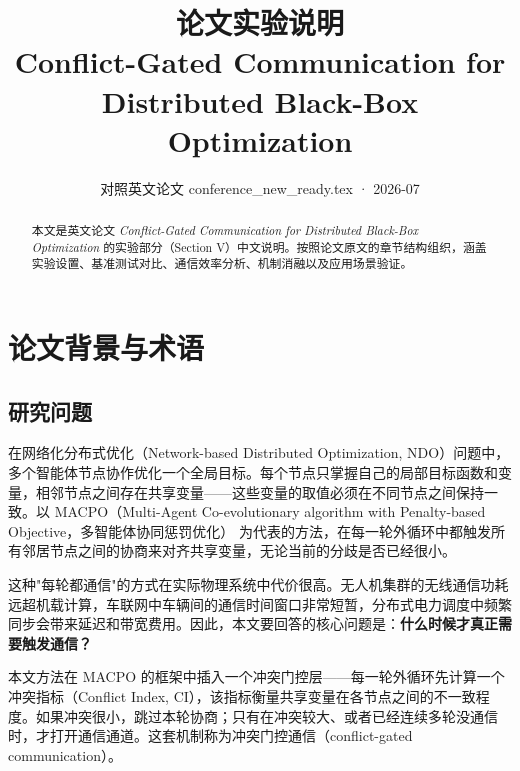 \documentclass[11pt,a4paper]{ctexart}
\title{\textbf{论文实验说明}\\[0.3em]
\large Conflict-Gated Communication for Distributed Black-Box Optimization}
\author{对照英文论文 conference\_new\_ready.tex · 2026-07}
\date{}
\begin{document}
\maketitle

\begin{abstract}
\noindent 本文是英文论文 \textit{Conflict-Gated Communication for Distributed Black-Box Optimization} 的实验部分（Section V）中文说明。按照论文原文的章节结构组织，涵盖实验设置、基准测试对比、通信效率分析、机制消融以及应用场景验证。
\end{abstract}

\tableofcontents
\newpage

\section{论文背景与术语}

\subsection{研究问题}
在网络化分布式优化（Network-based Distributed Optimization, NDO）问题中，多个智能体节点协作优化一个全局目标。每个节点只掌握自己的局部目标函数和变量，相邻节点之间存在共享变量——这些变量的取值必须在不同节点之间保持一致。以 MACPO（Multi-Agent Co-evolutionary algorithm with Penalty-based Objective，多智能体协同惩罚优化）\cite{ref_macpo} 为代表的方法，在每一轮外循环中都触发所有邻居节点之间的协商来对齐共享变量，无论当前的分歧是否已经很小。

这种"每轮都通信"的方式在实际物理系统中代价很高。无人机集群的无线通信功耗远超机载计算\cite{ref_dopt_robotics_2024}，车联网中车辆间的通信时间窗口非常短暂\cite{ref_dopt_iov_2024}，分布式电力调度中频繁同步会带来延迟和带宽费用\cite{ref_ndo_dispatch_2024}。因此，本文要回答的核心问题是：\textbf{什么时候才真正需要触发通信？}

本文方法在 MACPO 的框架中插入一个冲突门控层——每一轮外循环先计算一个冲突指标（Conflict Index, CI），该指标衡量共享变量在各节点之间的不一致程度。如果冲突很小，跳过本轮协商；只有在冲突较大、或者已经连续多轮没通信时，才打开通信通道。这套机制称为冲突门控通信（conflict-gated communication）。
\end{document}
